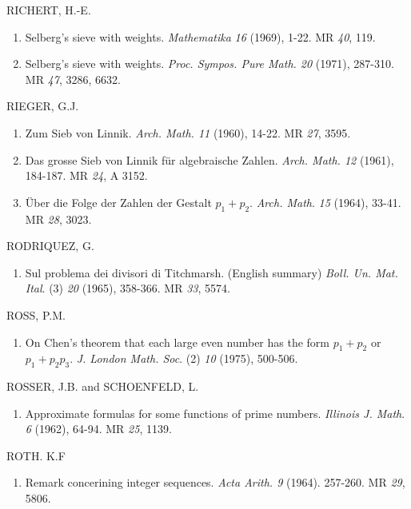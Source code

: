 \begin{thebibliography}{99}
 RICHERT, H.-E.
\begin{enumerate}
\item Selberg's sieve with weights. \textit{Mathematika} {\em 16}
  (1969), 1-22. MR {\em 40}, 119.

\item Selberg's sieve with weights. \textit{Proc. Sympos. Pure
  Math. 20} (1971), 287-310. MR {\em 47}, 3286, 6632. 
\end{enumerate}

 RIEGER, G.J.
\begin{enumerate}
\item Zum Sieb von Linnik. \textit{Arch. Math. 11} (1960), 14-22. MR
  {\em 27}, 3595. 

\item Das grosse Sieb von Linnik f\"ur algebraische
  Zahlen. \textit{Arch. Math. 12} (1961), 184-187. MR {\em 24}, A 3152. 

\item \"Uber die Folge der Zahlen der Gestalt
  $p_1+p_2$. \textit{Arch. Math}. {\em 15} (1964), 33-41. MR {\em 28},
  3023. 
\end{enumerate}

 RODRIQUEZ, G.
\begin{enumerate}
\item Sul problema dei divisori di Titchmarsh. (English summary)
  \textit{Boll. Un. Mat. Ital}. (3) {\em 20} (1965), 358-366. MR {\em
    33}, 5574. 
\end{enumerate}

 ROSS, P.M.
\begin{enumerate}
\item On Chen's theorem that each large even number has the form
  $p_1+p_2$ or $p_1+p_2p_3$. \textit{J. London Math. Soc}. (2) {\em
  10} (1975), 500-506.
\end{enumerate}

 ROSSER, J.B. and SCHOENFELD, L.
\begin{enumerate}
\item Approximate formulas for some functions of prime
  numbers. \textit{Illinois J. Math}. {\em 6} (1962), 64-94. MR {\em
    25}, 1139.
\end{enumerate}

 ROTH. K.F
\begin{enumerate}
\item Remark concerining integer sequences. \textit{Acta Arith. 9}
  (1964). 257-260. MR {\em 29}, 5806. 


\end{enumerate}
\end{thebibliography}
